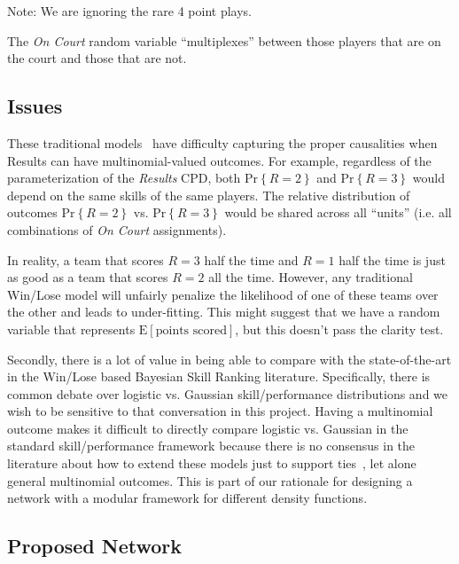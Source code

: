\documentclass[10pt,twocolumn]{article}
\newcommand{\prb}[1]{\ensuremath{  \mathrm{Pr}\left\{ #1 \right\}  }}
\newcommand{\Elin}[1]{\ensuremath{     \mathrm{E}\left[ #1 \right]   }}
\begin{document}
Note: We are ignoring the rare 4 point plays. 

The \emph{On Court} random variable ``multiplexes'' between those players that are on the court and those that are not.

\subsection{Issues}
\label{sec:badnetwork}
These traditional models~\cite{herbrich2007trueskilltm} have difficulty capturing the proper causalities when Results can have multinomial-valued outcomes.
For example, regardless of the parameterization of the \emph{Results} CPD, both $\prb{ R = 2}$ and $\prb{R= 3}$ would depend on the same skills of the same players.
The relative distribution of outcomes $\prb{R = 2}$ vs. $\prb{R = 3}$ would be shared across all ``units'' (i.e. all combinations of \emph{On Court} assignments).

In reality, a team that scores $R=3$ half the time and $R=1$ half the time is just as good as a team that scores $R=2$ all the time.
However, any traditional Win/Lose model will unfairly penalize the likelihood of one of these teams over the other and leads to under-fitting.
This might suggest that we have a random variable that represents $\Elin{\textrm{points scored}}$, but this doesn't pass the clarity test.

Secondly, there is a lot of value in being able to compare with the state-of-the-art in the Win/Lose based Bayesian Skill Ranking literature.
Specifically, there is common debate over logistic vs. Gaussian skill/performance distributions and we wish to be sensitive to that conversation in this project.
Having a multinomial outcome makes it difficult to directly compare logistic vs. Gaussian in the standard skill/performance framework because there is no consensus in the literature about how to extend these models just to support ties~\cite{hunter2004mm}, let alone general multinomial outcomes. This is part of our rationale for designing a network with a modular framework for different density functions.

\subsection{Proposed Network}
\label{sec:goodnetwork}
\end{document}
